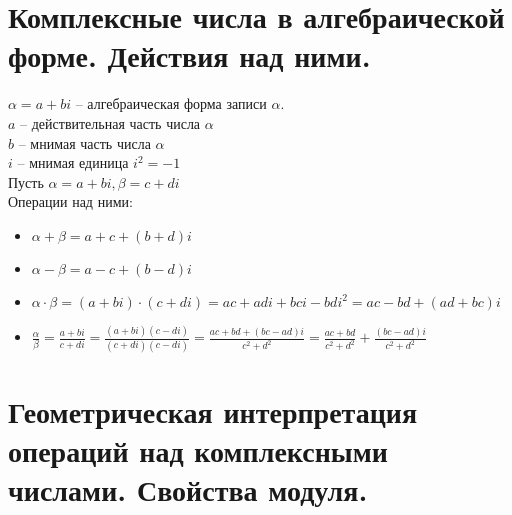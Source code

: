 \documentclass[12pt, fleqn]{article}
\begin{document}
\section{Комплексные числа в алгебраической форме. Действия над ними.}
$\alpha = a+bi$ -- алгебраическая форма записи $\alpha$.\\
$a$ -- действительная часть числа $\alpha$\\
$b$ -- мнимая часть числа $\alpha$\\
$i$ -- мнимая единица $i^2=-1$\\
Пусть $\alpha = a+bi, \beta=c+di$\\
Операции над ними:
\begin{itemize}
	\item $\alpha+\beta=a+c+(b+d)i$
	\item $\alpha-\beta= a-c+(b-d)i$
	\item $\alpha \cdot\beta=(a+bi)\cdot(c+di)=ac+adi+bci-bdi^2=ac-bd+(ad+bc)i$
	\item $\frac{\alpha}{\beta}=\frac{a+bi}{c+di}=\frac{(a+bi)(c-di)}{(c+di)(c-di)}=\frac{ac+bd+(bc-ad)i}{c^2+d^2}=\frac{ac+bd}{c^2+d^2}+\frac{(bc-ad)i}{c^2+d^2}$
\end{itemize}
\section{Геометрическая интерпретация операций над комплексными числами. Свойства модуля.}
\end{document}
